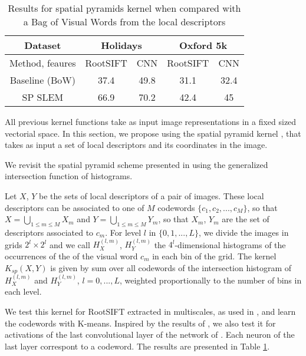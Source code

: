 \begin{table}[!h]
    \centering
    \caption{Results for spatial pyramids kernel when compared with a Bag of Visual Words from the local descriptors}
    \begin{tabular}{|c|c|c|c|c|}
    \hline
    Dataset & \multicolumn{2}{|c|}{\textbf{Holidays}} & \multicolumn{2}{|c|}{\textbf{Oxford 5k}}\\
    \hline
        Method, feaures & RootSIFT & CNN & RootSIFT
        &CNN \\
    \hline
    \hline
    Baseline (BoW) & 37.4 & 49.8 & 31.1 & 32.4 \\
        SP SLEM    & 66.9 & 70.2 & 42.4 & 45 \\
    \hline
    \end{tabular}
    \label{tab:spk}
\end{table}
All previous kernel functions take as input image representations in a fixed sized vectorial space. In this section, we propose using the spatial pyramid kernel \cite{GrauDa05}, that takes as input a set of local descriptors and its coordinates in the image.

We revisit the spatial pyramid scheme presented in \cite{spk} using the generalized intersection function of histograms.

Let $X$, $Y$ be the sets of local descriptors of a pair of images.
These local descriptors can be associated to one of $M$ codewords $\{c_1,c_2,...,c_M\}$, so that $X=\bigcup_{1\leq m \leq M}X_m$ and $Y=\bigcup_{1\leq m \leq M}Y_m$, so that $X_m$, $Y_m$ are the set of descriptors associated to $c_m$.
For level $l$ in $\{0,1,..., L\}$, we divide the images in grids $2^l\times 2^l$ and we call $H^{(l,m)}_X$, $H^{(l,m)}_Y$ the $4^l$-dimensional histograms of the occurrences of the of the visual word $c_m$ in each bin of the grid.
The kernel $K_{sp}(X,Y)$ is given by sum over all codewords of the intersection histogram of $H^{(l,m)}_X$ and $H^{(l,m)}_Y$, $l=0,...,L$,  weighted proportionally to the number of bins in each level.

We test this kernel for RootSIFT extracted in multiscales, as used in \cite{spk}, and learn the codewords with K-means. Inspired by the results of \cite{SPPCNN}, we also test it for activations of the last convolutional layer of the network of \cite{SimonZisser15}. Each neuron of the last layer correspont to a codeword. The results are presented in Table \ref{tab:spk}.




